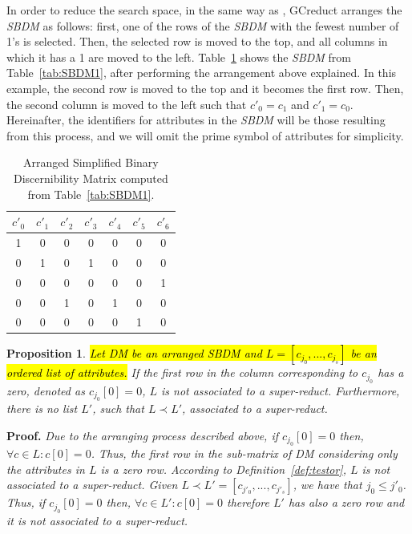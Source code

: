 \documentclass[number,preprint,review,12pt]{elsarticle}
\newtheorem{proposition}{Proposition}
\begin{document}
	\label{arrange}
	In order to reduce the search space, in the same way as \citep{Sanchez07,Lias13}, GCreduct arranges the \textit{SBDM} as follows: first, one of the rows of the \textit{SBDM} with the fewest number of 1's is selected. Then, the selected row is moved to the top, and all columns in which it has a 1 are moved to the left. Table~\ref{tab:SSBDM1} shows the \textit{SBDM} from Table~\ref{tab:SBDM1}, after performing the arrangement above explained. In this example, the second row is moved to the top and it becomes the first row. Then, the second column is moved to the left such that $c'_0 = c_1$ and $c'_1 = c_0$. Hereinafter, the identifiers for attributes in the \textit{SBDM} will be those resulting from this process, and we will omit the prime symbol of attributes for simplicity.
			
	\begin{table}[htb]
		\caption{Arranged Simplified Binary Discernibility Matrix computed from Table~\ref{tab:SBDM1}.}
		\centering
		\begin{tabular}{ccccccc}\label{tab:SSBDM1}
			$c'_0$ & $c'_1$ & $c'_2$ & $c'_3$ & $c'_4$ & $c'_5$ & $c'_6$\\
			\hline
			1&0&0&0&0&0&0\\
			0&1&0&1&0&0&0\\
			0&0&0&0&0&0&1\\
			0&0&1&0&1&0&0\\
			0&0&0&0&0&1&0\\
		\end{tabular}             
	\end{table}  
	
	\begin{proposition}\label{prop:firstRow}
		\hl{Let DM be an arranged SBDM and $L = [c_{j_0},...,c_{j_s}]$ be an ordered list of attributes.} If the first row in the column corresponding to $c_{j_0}$ has a zero, denoted as $c_{j_0}[0]=0$, $L$ is not associated to a super-reduct. Furthermore, there is no list $L'$, such that $L\prec L'$, associated to a super-reduct.
	\end{proposition}
	
	\noindent
	\textbf{Proof.} \textit{Due to the arranging process described above, if $c_{j_0}[0]=0$ then, $\forall c \in L: c[0]=0$. Thus, the first row in the sub-matrix of DM considering only the attributes in $L$ is a zero row. According to Definition~\ref{def:testor}, $L$ is not associated to a super-reduct. Given $L \prec L'= [c_{j'_0},...,c_{j'_s}]$, we have that $j_0 \leq j'_0$. Thus, if $c_{j_0}[0]=0$ then, $\forall c \in L': c[0]=0$ therefore $L'$ has also a zero row and it is not associated to a super-reduct.}
	
\end{document}

